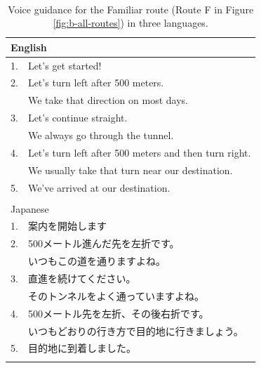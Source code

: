 \begin{table}[h]
\centering
\caption{Voice guidance for the Familiar route (Route F in Figure \ref{fig:b-all-routes}) in three languages.}~\label{tab:b-familiar-pure}
\begin{tabular}{ll}
\hline
\multicolumn{2}{l}{English}                                                                                            \\ \hline
1. & Let's get started!                                                                                                \\
2. & Let's turn left after 500 meters. \\ 
   & We take that direction on most days. \\
3. & Let's continue straight. \\ 
   & We always go through the tunnel.              \\
4. & Let's turn left after 500 meters and then turn right. \\ 
   & We usually take that turn near our destination. \\
5. & We've arrived at our destination.                                                                                 \\ \hline
   &                                                                                                                   \\ \hline
\multicolumn{2}{l}{Japanese}                                                                                           \\ \hline
1. & 案内を開始します                                                                                                          \\
2. & 500メートル進んだ先を左折です。\\ 
   & いつもこの道を通りますよね。                                      \\
3. & 直進を続けてください。\\ 
   & そのトンネルをよく通っていますよね。                                          \\
4. & 500メートル先を左折、その後右折です。\\ 
   & いつもどおりの行き方で目的地に行きましょう。                           \\
5. & 目的地に到着しました。                                                                                                      \\ \hline
   &                                                                                                                   \\ \hline

\end{tabular}
\end{table}
